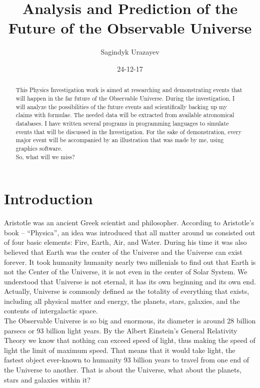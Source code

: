 \documentclass[a4paper]{IEEEtran}
\title{Analysis and Prediction of the Future of the Observable Universe}
\author{Sagindyk Urazayev}
\date{24-12-17}
\begin{document}
\maketitle

\begin{abstract}
  This Physics Investigation work is aimed at researching and demonstrating events that will happen in the far future of the Observable Universe.
  During the investigation, I will analyze the possibilities of the future events and scientifically backing up my claims with formulae. The needed data will be extracted from available atronomical databases. I have written several programs in programming languages to simulate events that will be discussed in the Investigation. For the sake of demonstration, every major event will be accompanied by an illustration that was made by me, using graphics software.\\
  So, what will we miss?
\end{abstract}

\section{Introduction}

Aristotle was an ancient Greek scientist and philosopher. According to Aristotle’s book – “Physica”, an idea was introduced that all matter around us consisted out of four basic elements: Fire, Earth, Air, and Water\cite{aether}. During his time it was also believed that Earth was the center of the Universe and the Universe can exist forever. It took humanity humanity nearly two millenials to find out that Earth is not the Center of the Universe, it is not even in the center of Solar System. We understood that Universe is not eternal, it has its own beginning and its own end. Actually, Universe is commonly defined as the totality of everything that exists, including all physical matter and energy, the planets, stars, galaxies, and the contents of intergalactic space.\cite{universe}\\

The Observable Universe is so big and enormous, its diameter is around 28 billion parsecs or 93 billion light years.\cite{size} By the Albert Einstein's General Relativity Theory we know that nothing can exceed speed of light, thus making the speed of light the limit of maximum speed\cite{speed}. That means that it would take light, the fastest object ever-known to humanity 93 billion years to travel from one end of the Universe to another. That is about the Universe, what about the planets, stars and galaxies within it?\\
\end{document}
